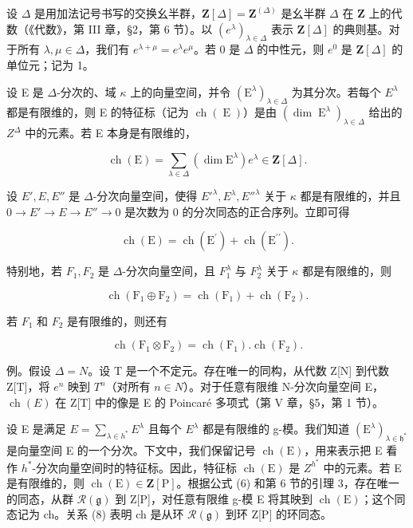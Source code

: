设 \(\Delta\) 是用加法记号书写的交换幺半群，\(\mathbf{Z}[\Delta] = \mathbf{Z}^{(\Delta)}\) 是幺半群 \(\Delta\) 在 \(\mathbf{Z}\) 上的代数（《代数》，第 III 章，§2，第 6 节）。以 \((e^{\lambda})_{\lambda \in \Delta}\) 表示 \(\mathbf{Z}[\Delta]\) 的典则基。对于所有 \(\lambda, \mu \in \Delta\)，我们有 \(e^{\lambda + \mu} = e^{\lambda}e^{\mu}\)。若 0 是 \(\Delta\) 的中性元，则 \(e^0\) 是 \(\mathbf{Z}[\Delta]\) 的单位元；记为 1。

设 E 是 \(\Delta\)-分次的、域 \(\kappa\) 上的向量空间，并令 \((\mathrm{E}^{\lambda})_{\lambda\in\Delta}\) 为其分次。若每个 \(E^{\lambda}\) 都是有限维的，则 E 的特征标（记为 \(\operatorname{ch}(\operatorname{E})\)）是由 \((\dim\operatorname{E}^{\lambda})_{\lambda\in\Delta}\) 给出的 \(Z^{\Delta}\) 中的元素。若 E 本身是有限维的，

\[
\operatorname{ch} (\mathrm{E}) = \sum_ {\lambda \in \Delta} (\dim \mathrm{E} ^ {\lambda}) e ^ {\lambda} \in \mathbf {Z} [ \Delta ].\tag{5}
\]

设 \(E', E, E''\) 是 \(\Delta\)-分次向量空间，使得 \(E'^{\lambda}, E^{\lambda}, E''^{\lambda}\) 关于 \(\kappa\) 都是有限维的，并且 \(0 \longrightarrow E' \longrightarrow E \longrightarrow E'' \longrightarrow 0\) 是次数为 0 的分次同态的正合序列。立即可得

\[
\operatorname{ch} (\mathrm{E}) = \operatorname{ch} (\mathrm{E} ^ {\prime}) + \operatorname{ch} (\mathrm{E} ^ {\prime \prime}).\tag{6}
\]

特别地，若 \(F_{1}, F_{2}\) 是 \(\Delta\)-分次向量空间，且 \(F_{1}^{\lambda}\) 与 \(F_{2}^{\lambda}\) 关于 \(\kappa\) 都是有限维的，则

\[
\operatorname{ch} \left(\mathrm{F} _ {1} \oplus \mathrm{F} _ {2}\right) = \operatorname{ch} \left(\mathrm{F} _ {1}\right) + \operatorname{ch} \left(\mathrm{F} _ {2}\right).\tag{7}
\]

若 \(F_{1}\) 和 \(F_{2}\) 是有限维的，则还有

\[
\operatorname{ch} \left(\mathrm{F} _ {1} \otimes \mathrm{F} _ {2}\right) = \operatorname{ch} \left(\mathrm{F} _ {1}\right). \operatorname{ch} \left(\mathrm{F} _ {2}\right).\tag{8}
\]

例。假设 \(\Delta = N\)。设 T 是一个不定元。存在唯一的同构，从代数 Z{[}N{]} 到代数 Z{[}T{]}，将 \(e^{n}\) 映到 \(T^{n}\)（对所有 \(n \in N\)）。对于任意有限维 N-分次向量空间 E，\(\operatorname{ch}(E)\) 在 Z{[}T{]} 中的像是 E 的 Poincaré 多项式（第 V 章，§5，第 1 节）。

设 E 是满足 \(E = \sum_{\lambda \in h^{*}} E^{\lambda}\) 且每个 \(E^{\lambda}\) 都是有限维的 g-模。我们知道 \((\mathrm{E}^{\lambda})_{\lambda \in \mathfrak{h}^{*}}\) 是向量空间 E 的一个分次。下文中，我们保留记号 \(\operatorname{ch}(\mathrm{E})\)，用来表示把 E 看作 \(h^{*}\)-分次向量空间时的特征标。因此，特征标 \(\operatorname{ch}(\mathrm{E})\) 是 \(Z^{h^{*}}\) 中的元素。若 E 是有限维的，则 \(\operatorname{ch}(\mathrm{E}) \in \mathbf{Z}[\mathrm{P}]\)。根据公式 (6) 和第 6 节的引理 3，存在唯一的同态，从群 \(\mathcal{R}(\mathfrak{g})\) 到 Z{[}P{]}，对任意有限维 g-模 E 将其映到 \(\operatorname{ch}(\mathrm{E})\)；这个同态记为 ch。关系 (8) 表明 ch 是从环 \(\mathcal{R}(\mathfrak{g})\) 到环 Z{[}P{]} 的环同态。

